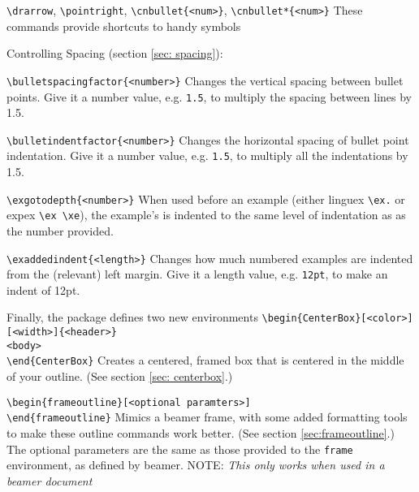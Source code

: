 \documentclass[11pt]{article}
\begin{document}
	\2 {\color{blue}\verb+\drarrow+}, {\color{blue}\verb+\pointright+}, {\color{blue}\verb+\cnbullet{<num>}+}, {\color{blue}\verb+\cnbullet*{<num>}+}
		\3 These commands provide shortcuts to handy symbols

\1 Controlling Spacing (section \ref{sec: spacing}):

	\2 {\color{blue}\verb+\bulletspacingfactor{<number>}+}
		\3 Changes the vertical spacing between bullet points. Give it a number value, e.g. \verb+1.5+, to multiply the spacing between lines by 1.5.

	\2 {\color{blue}\verb+\bulletindentfactor{<number>}+}
		\3 Changes the horizontal spacing of bullet point indentation. Give it a number value, e.g. \verb+1.5+, to multiply all the indentations by 1.5.


	\2 {\color{blue}\verb+\exgotodepth{<number>}+}
		\3 When used before an example (either linguex \verb+\ex.+ or expex \verb+\ex \xe+), the example's is indented to the same level of indentation as as the number provided.
		
	\2 {\color{blue}\verb+\exaddedindent{<length>}+}
		\3 Changes how much numbered examples are indented from the (relevant) left margin. Give it a length value, e.g. \verb+12pt+, to make an indent of 12pt.


\1 Finally, the package defines two new environments
	\2 {\color{blue}\verb+\begin{CenterBox}[<color>][<width>]{<header>}+\\\verb+<body>+\\\verb+\end{CenterBox}+}
		\3 Creates a centered, framed box that is centered in the middle of your outline. (See section \ref{sec: centerbox}.)

	\2 {\color{blue}\verb+\begin{frameoutline}[<optional paramters>]+\\\verb+\end{frameoutline}+}
		\3 Mimics a beamer frame, with some added formatting tools to make these outline commands work better. (See section \ref{sec:frameoutline}.) The optional parameters are the same as those provided to the \verb+frame+ environment, as defined by beamer.
		\3 NOTE: \textit{This only works when used in a beamer document}
	
\end{document}
